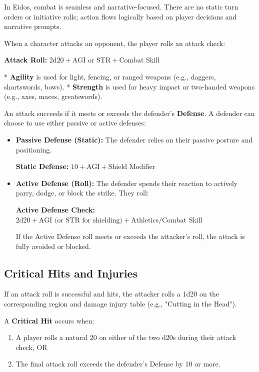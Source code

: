 In Eidos, combat is seamless and narrative-focused. There are no static turn orders or initiative rolls; action flows logically based on player decisions and narrative prompts. 

When a character attacks an opponent, the player rolls an attack check:
\begin{center}
    \textbf{Attack Roll:} $2\text{d}20 + \text{AGI or STR} + \text{Combat Skill}$
\end{center}
* \textbf{Agility} is used for light, fencing, or ranged weapons (e.g., daggers, shortswords, bows).
* \textbf{Strength} is used for heavy impact or two-handed weapons (e.g., axes, maces, greatswords).

An attack succeeds if it meets or exceeds the defender's \textbf{Defense}. A defender can choose to use either passive or active defenses:

\begin{itemize}
    \item \textbf{Passive Defense (Static):} The defender relies on their passive posture and positioning. 
    \begin{center}
        \textbf{Static Defense:} $10 + \text{AGI} + \text{Shield Modifier}$
    \end{center}
    \item \textbf{Active Defense (Roll):} The defender spends their reaction to actively parry, dodge, or block the strike. They roll:
    \begin{center}
        \textbf{Active Defense Check:} $2\text{d}20 + \text{AGI (or STR for shielding)} + \text{Athletics/Combat Skill}$
    \end{center}
    If the Active Defense roll meets or exceeds the attacker's roll, the attack is fully avoided or blocked.
\end{itemize}

\subsection{Critical Hits and Injuries}

If an attack roll is successful and hits, the attacker rolls a 1d20 on the corresponding region and damage injury table (e.g., "Cutting in the Head"). 

A \textbf{Critical Hit} occurs when:
\begin{enumerate}
    \item A player rolls a natural 20 on either of the two d20s during their attack check, OR
    \item The final attack roll exceeds the defender's Defense by 10 or more.
\end{enumerate}


